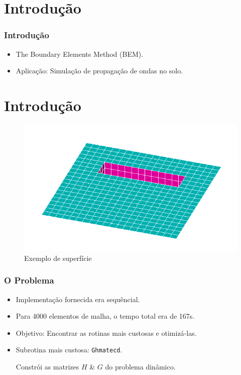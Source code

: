 \documentclass{beamer}
\begin{document}
%

\section{Introdução}
\begin{frame}
\frametitle{Introdução}
\begin{itemize}
\item The Boundary Elements Method (BEM). 
\item Aplicação: Simulação de propagação de ondas no solo. 
\end{itemize}
\end{frame}


\section{Introdução}
\begin{frame}
\begin{figure}
	\includegraphics[scale=0.5]{trincheira.png}
	\caption{Exemplo de superfície}
\end{figure}

\end{frame}


\begin{frame}
\frametitle{O Problema}
\begin{itemize}
\item Implementação fornecida era sequêncial.
\item Para 4000 elementos de malha, o tempo total era de 167s.
\item Objetivo: Encontrar as rotinas mais custosas e otimizá-las.
\item Subrotina mais custosa: \texttt{Ghmatecd}.
\begin{itemize}
 Constrói as matrizes $H$ \& $G$ do problema dinâmico.
\end{itemize}
\end{itemize}
\end{frame}
\end{document}
